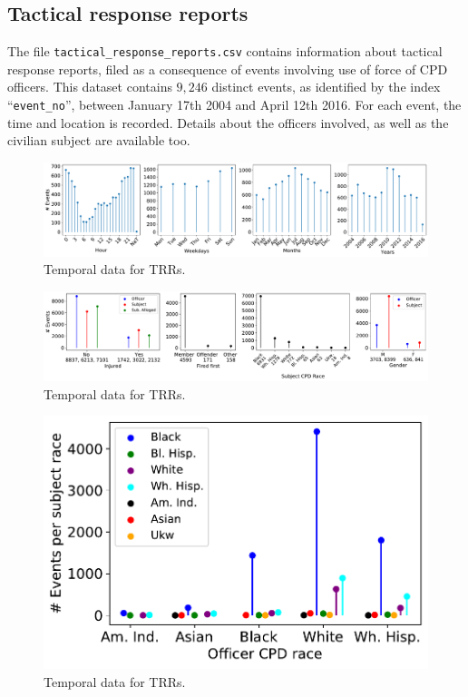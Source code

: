 \subsection{Tactical response reports}

The file \texttt{tactical\_response\_reports.csv} contains information about tactical response reports, filed as a consequence of  events involving use of force of CPD officers. This dataset contains $9{,}246$ distinct events, as identified by the index ``\texttt{event\_no}'', between January 17th 2004 and April 12th 2016. For each event, the time and location is recorded. Details about the officers involved, as well as the civilian subject are available too. 

\begin{figure}[h] 
	\includegraphics[width=\textwidth]{figs/trrs_times} 
	\caption{Temporal data for TRRs.} \label{fig:trrs_times}
\end{figure}

\begin{figure}[h] 
	\includegraphics[width=\textwidth]{figs/trr_stats} 
	\caption{Temporal data for TRRs.} \label{fig:trrs_stats1}
\end{figure}

\begin{figure}[h] 
	\includegraphics[width=\textwidth]{figs/trr_stats_race_race} 
	\caption{Temporal data for TRRs.} \label{fig:trrs_stats2}
\end{figure}

